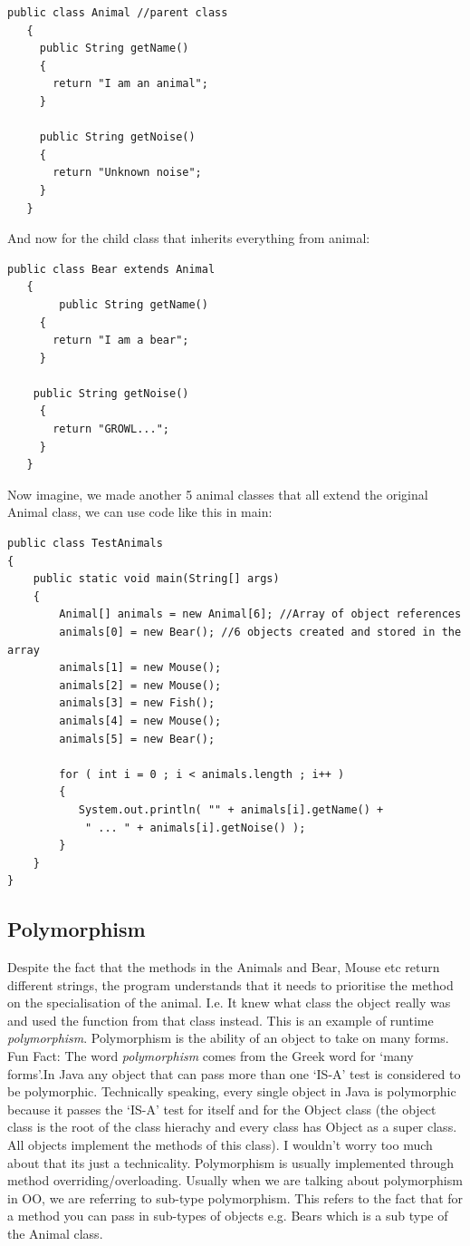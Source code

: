 \documentclass{article}
\begin{document}
\begin{lstlisting}
public class Animal //parent class
   {
	 public String getName()
	 {
	   return "I am an animal";
	 }

	 public String getNoise()
	 {
	   return "Unknown noise";
	 }
   }
\end{lstlisting}

And now for the child class that inherits everything from animal:

\begin{lstlisting}
public class Bear extends Animal
   {
        public String getName()
	 {
	   return "I am a bear";
	 }

	public String getNoise()
	 {
	   return "GROWL...";
	 }
   }
\end{lstlisting}

Now imagine, we made another 5 animal classes that all extend the original Animal class, we
can use code like this in main:

\begin{lstlisting}
public class TestAnimals
{
	public static void main(String[] args)
	{
		Animal[] animals = new Animal[6]; //Array of object references
		animals[0] = new Bear(); //6 objects created and stored in the array 
		animals[1] = new Mouse();
		animals[2] = new Mouse();
		animals[3] = new Fish();
		animals[4] = new Mouse();
		animals[5] = new Bear();

		for ( int i = 0 ; i < animals.length ; i++ )
		{
		   System.out.println( "" + animals[i].getName() +
			" ... " + animals[i].getNoise() );
		}
	}
}
\end{lstlisting}

\subsection{Polymorphism}

Despite the fact that the methods in the Animals and Bear, Mouse etc return different strings,
the program understands that it needs to prioritise the method on the specialisation of the 
animal. I.e. It knew what class the object really was and used the function from that class 
instead. This is an example of runtime \emph{polymorphism}. Polymorphism is the ability of an 
object to take on many forms. Fun Fact: The word \emph{polymorphism} comes from the Greek word
for `many forms'.In Java any object that can pass more than one `IS-A' test is considered to be
polymorphic. Technically speaking, every single object in Java is polymorphic because it passes 
the `IS-A' test for itself and for the Object class (the object class is the root of the class 
hierachy and every class has Object as a super class. All objects implement the methods of this 
class). I wouldn't worry too much about that its just a technicality. Polymorphism is usually 
implemented through method overriding/overloading. Usually when we are talking about polymorphism
in OO, we are referring to sub-type polymorphism. This refers to the fact that for a method you
can pass in sub-types of objects e.g. Bears which is a sub type of the Animal class.
\end{document}
